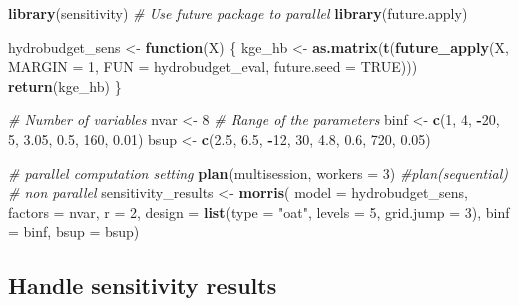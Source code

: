 \documentclass[
]{book}
\newenvironment{Shaded}{\begin{snugshade}}{\end{snugshade}}
\newcommand{\AttributeTok}[1]{\textcolor[rgb]{0.13,0.29,0.53}{#1}}
\newcommand{\CommentTok}[1]{\textcolor[rgb]{0.56,0.35,0.01}{\textit{#1}}}
\newcommand{\ConstantTok}[1]{\textcolor[rgb]{0.56,0.35,0.01}{#1}}
\newcommand{\ControlFlowTok}[1]{\textcolor[rgb]{0.13,0.29,0.53}{\textbf{#1}}}
\newcommand{\DecValTok}[1]{\textcolor[rgb]{0.00,0.00,0.81}{#1}}
\newcommand{\FloatTok}[1]{\textcolor[rgb]{0.00,0.00,0.81}{#1}}
\newcommand{\FunctionTok}[1]{\textcolor[rgb]{0.13,0.29,0.53}{\textbf{#1}}}
\newcommand{\NormalTok}[1]{#1}
\newcommand{\OtherTok}[1]{\textcolor[rgb]{0.56,0.35,0.01}{#1}}
\newcommand{\SpecialCharTok}[1]{\textcolor[rgb]{0.81,0.36,0.00}{\textbf{#1}}}
\newcommand{\StringTok}[1]{\textcolor[rgb]{0.31,0.60,0.02}{#1}}
\begin{document}
\begin{Shaded}
\begin{Highlighting}[]
\FunctionTok{library}\NormalTok{(sensitivity)}
\CommentTok{\# Use future package to parallel}
\FunctionTok{library}\NormalTok{(future.apply)}

\NormalTok{hydrobudget\_sens }\OtherTok{\textless{}{-}} \ControlFlowTok{function}\NormalTok{(X) \{}
\NormalTok{  kge\_hb }\OtherTok{\textless{}{-}} \FunctionTok{as.matrix}\NormalTok{(}\FunctionTok{t}\NormalTok{(}\FunctionTok{future\_apply}\NormalTok{(X, }\AttributeTok{MARGIN =} \DecValTok{1}\NormalTok{, }\AttributeTok{FUN =}\NormalTok{ hydrobudget\_eval, }\AttributeTok{future.seed =} \ConstantTok{TRUE}\NormalTok{)))}
  \FunctionTok{return}\NormalTok{(kge\_hb)}
\NormalTok{\}}

\CommentTok{\# Number of variables}
\NormalTok{nvar }\OtherTok{\textless{}{-}} \DecValTok{8}
\CommentTok{\# Range of the parameters}
\NormalTok{binf }\OtherTok{\textless{}{-}} \FunctionTok{c}\NormalTok{(}\DecValTok{1}\NormalTok{, }\DecValTok{4}\NormalTok{, }\SpecialCharTok{{-}}\DecValTok{20}\NormalTok{, }\DecValTok{5}\NormalTok{, }\FloatTok{3.05}\NormalTok{, }\FloatTok{0.5}\NormalTok{, }\DecValTok{160}\NormalTok{, }\FloatTok{0.01}\NormalTok{)}
\NormalTok{bsup }\OtherTok{\textless{}{-}} \FunctionTok{c}\NormalTok{(}\FloatTok{2.5}\NormalTok{, }\FloatTok{6.5}\NormalTok{, }\SpecialCharTok{{-}}\DecValTok{12}\NormalTok{, }\DecValTok{30}\NormalTok{, }\FloatTok{4.8}\NormalTok{, }\FloatTok{0.6}\NormalTok{, }\DecValTok{720}\NormalTok{, }\FloatTok{0.05}\NormalTok{)}

\CommentTok{\# parallel computation setting}
\FunctionTok{plan}\NormalTok{(multisession, }\AttributeTok{workers =} \DecValTok{3}\NormalTok{)}
\CommentTok{\#plan(sequential) \# non parallel}
\NormalTok{sensitivity\_results }\OtherTok{\textless{}{-}} \FunctionTok{morris}\NormalTok{(}
  \AttributeTok{model =}\NormalTok{ hydrobudget\_sens,}
  \AttributeTok{factors =}\NormalTok{ nvar,}
  \AttributeTok{r =} \DecValTok{2}\NormalTok{,}
  \AttributeTok{design =} \FunctionTok{list}\NormalTok{(}\AttributeTok{type =} \StringTok{"oat"}\NormalTok{, }\AttributeTok{levels =} \DecValTok{5}\NormalTok{, }\AttributeTok{grid.jump =} \DecValTok{3}\NormalTok{),}
  \AttributeTok{binf =}\NormalTok{ binf,}
  \AttributeTok{bsup =}\NormalTok{ bsup)}
\end{Highlighting}
\end{Shaded}

\hypertarget{handle-sensitivity-results}{%
\subsection{Handle sensitivity results}\label{handle-sensitivity-results}}
\end{document}
